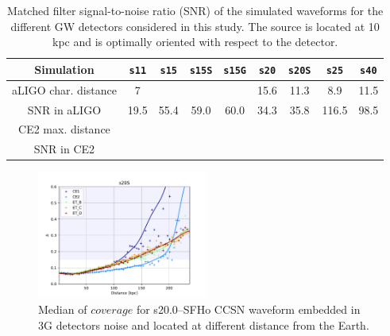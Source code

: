 \begin{table}
  \centering
  \begin{tabular}{c|cccccccc}
    \hline
    
    Simulation & \texttt{s11} & \texttt{s15} & \texttt{s15S} & \texttt{s15G} & \texttt{s20} & \texttt{s20S} & \texttt{s25}  & \texttt{s40}
    \\   
    \hline
    aLIGO char. distance & 7     &            &                &               &   15.6           &    11.3   &  8.9             &  11.5
    \\ 
    \hline
    SNR in aLIGO         & 19.5 & 55.4        & 59.0          &   60.0        & 34.3         &   35.8          & 116.5         & 98.5
    \\
    \hline
    \hline
    CE2  max. distance  &      &            &                &               &              &                 &               & 
    \\
    \hline
    SNR in CE2      &      &            &                &               &              &                 &               &
    \\
    \hline
    \hline
  \end{tabular}
  \caption{%
    Matched filter signal-to-noise ratio (SNR) of the simulated waveforms for
    the different GW detectors considered in this study. The source is located
    at 10 kpc and is optimally oriented with respect to the detector.
  }
  \label{Tab:results}
\end{table}

\begin{figure}
  \centering
  \includegraphics[width=0.5\textwidth]{plots/s20--SFHo_all3G}
  \caption{Median of $coverage$ for s20.0--SFHo CCSN waveform embedded in 3G detectors noise and located at different distance from the Earth. } \label{fig:s20--SFHo_all3G}
\end{figure}
